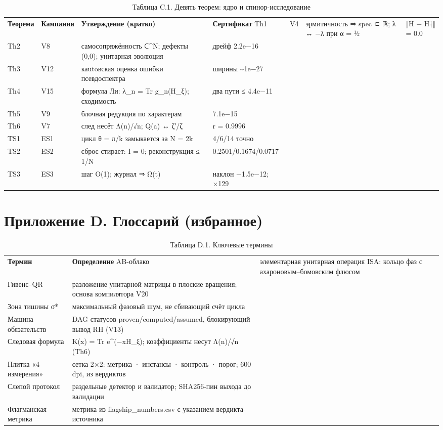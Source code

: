 \documentclass[11pt,a4paper]{article}
\begin{document}
\begin{table}[htbp]\centering\small
\caption{Таблица C.1. Девять теорем: ядро и спинор-исследование}
\begin{tabular}{p{} p{} p{} p{}}
\toprule
\textbf{Теорема} & \textbf{Кампания} & \textbf{Утверждение (кратко)} & \textbf{Сертификат}
\midrule
Th1 & V4 & эрмитичность ⇒ spec ⊂ ℝ; λ ↔ −λ при α = ½ & ‖H − H†‖ = 0.0 \\
Th2 & V8 & самосопряжённость ℂ\textasciicircum{}N; дефекты (0,0); унитарная эволюция & дрейф 2.2e−16 \\
Th3 & V12 & каutoвская оценка ошибки псевдоспектра & ширины \textasciitilde{}1e−27 \\
Th4 & V15 & формула Ли: λ\_n = Tr g\_n(H\_ξ); сходимость & два пути ≤ 4.4e−11 \\
Th5 & V9 & блочная редукция по характерам & 7.1e−15 \\
Th6 & V7 & след несёт Λ(n)/√n; Q(a) ↔ ζ′/ζ & r = 0.9996 \\
TS1 & ES1 & цикл θ = π/k замыкается за N = 2k & 4/6/14 точно \\
TS2 & ES2 & сброс стирает: I = 0; реконструкция ≤ 1/N & 0.2501/0.1674/0.0717 \\
TS3 & ES3 & шаг O(1); журнал ⇒ Ω(t) & наклон −1.5e−12; ×129 \\
\bottomrule
\end{tabular}
\end{table}

\section{Приложение D. Глоссарий (избранное)}

\begin{table}[htbp]\centering\small
\caption{Таблица D.1. Ключевые термины}
\begin{tabular}{p{} p{}}
\toprule
\textbf{Термин} & \textbf{Определение}
\midrule
AB-облако & элементарная унитарная операция ISA: кольцо фаз с ахароновым–бомовским флюсом \\
Гивенс–QR & разложение унитарной матрицы в плоские вращения; основа компилятора V20 \\
Зона тишины σ* & максимальный фазовый шум, не сбивающий счёт цикла \\
Машина обязательств & DAG статусов proven/computed/assumed, блокирующий вывод RH (V13) \\
Следовая формула & K(x) = Tr e\textasciicircum{}(−xH\_ξ); коэффициенты несут Λ(n)/√n (Th6) \\
Плитка «4 измерения» & сетка 2×2: метрика · инстансы · контроль · порог; 600 dpi, из вердиктов \\
Слепой протокол & раздельные детектор и валидатор; SHA256-пин выхода до валидации \\
Флагманская метрика & метрика из flagship\_numbers.csv с указанием вердикта-источника \\
\bottomrule
\end{tabular}
\end{table}
\end{document}
